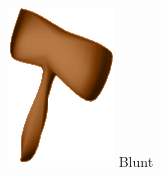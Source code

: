 \begin{frame}
\begin{columns}
\begin{column}[b]{0.22\textwidth}
\begin{center}
				\includegraphics[width=\textwidth]{./img/2_mesh/bluntAxeShaded.png}
				\small{Blunt}
			\end{center}	
		\end{column}
		\begin{column}[b]{0.22\textwidth}
			\begin{center}

\end{center}
\end{column}
\end{columns}
\end{frame}
